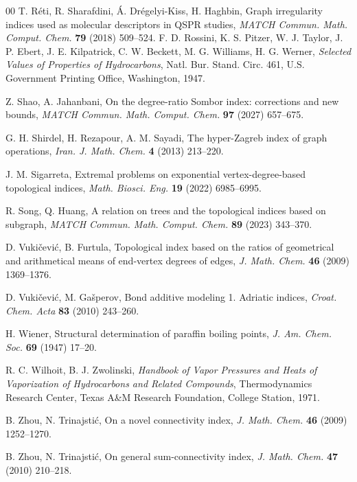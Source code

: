 \documentclass[a5paper, 10pt]{article}
\theoremstyle{plain}
\theoremstyle{remark}
\theoremstyle{definition}
\begin{document}
\begin{thebibliography}{00}
   T. R\'eti, R. Sharafdini,
  \'A. Dr\'egelyi-Kiss, H. Haghbin, Graph irregularity indices used as
  molecular descriptors in QSPR studies, \textit{MATCH Commun. Math.
  Comput. Chem.\/} \textbf{79} (2018) 509--524.
   F. D. Rossini, K. S. Pitzer, W. J. Taylor,
  J. P. Ebert, J. E. Kilpatrick, C. W. Beckett, M. G. Williams, H. G. Werner,
  \textit{Selected Values of Properties of Hydrocarbons\/}, Natl. Bur.
  Stand. Circ. 461, U.S. Government Printing Office, Washington, 1947.

   Z. Shao, A. Jahanbani, On the degree-ratio Sombor
  index: corrections and new bounds, \textit{MATCH Commun. Math. Comput.
  Chem.\/} \textbf{97} (2027) 657--675.

   G. H. Shirdel, H. Rezapour,
  A. M. Sayadi, The hyper-Zagreb index of graph operations,
  \textit{Iran. J. Math. Chem.\/} \textbf{4} (2013) 213--220.

 J. M. Sigarreta, Extremal problems on
  exponential vertex-degree-based topological indices, \textit{Math.
  Biosci. Eng.\/} \textbf{19} (2022) 6985--6995.

   R. Song, Q. Huang, A relation on trees and the
  topological indices based on subgraph, \textit{MATCH Commun. Math.
  Comput. Chem.\/} \textbf{89} (2023) 343--370.

   D. Vuki\v{c}evi\'c, B. Furtula, Topological
  index based on the ratios of geometrical and arithmetical means of
  end-vertex degrees of edges, \textit{J. Math. Chem.\/} \textbf{46} (2009)
  1369--1376.

   D. Vuki\v{c}evi\'c, M. Ga\v{s}perov, Bond additive
  modeling 1. Adriatic indices, \textit{Croat. Chem. Acta\/} \textbf{83} (2010)
  243--260.

   H. Wiener, Structural determination of paraffin boiling
  points, \textit{J. Am. Chem. Soc.\/} \textbf{69} (1947) 17--20.

   R. C. Wilhoit, B. J. Zwolinski,
  \textit{Handbook of Vapor Pressures and Heats of Vaporization of
  Hydrocarbons and Related Compounds\/}, Thermodynamics Research Center, Texas A\&M Research Foundation, College Station, 1971.

  B. Zhou, N. Trinajsti\'c, On a novel connectivity index, \textit{J. Math.
  Chem.\/} \textbf{46} (2009) 1252--1270.

   B. Zhou, N. Trinajsti\'c, On general
  sum-connectivity index, \textit{J. Math. Chem.\/} \textbf{47} (2010)
  210--218.

\end{thebibliography}
\end{document}
